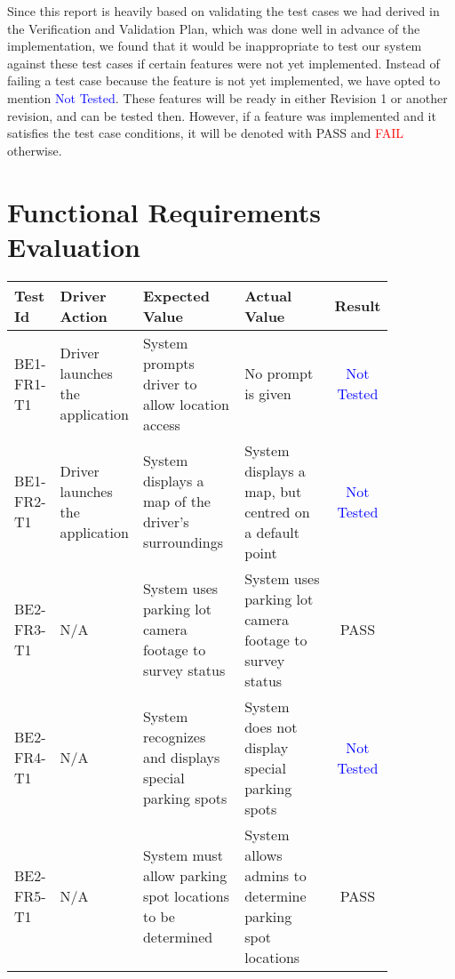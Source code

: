 \documentclass[12pt, titlepage]{article}
\begin{document}
\listoftables %

\listoffigures %

\newpage


Since this report is heavily based on validating the test cases we had derived
in the Verification and Validation Plan, which was done well in advance of the
implementation, we found that it would be inappropriate to test our system
against these test cases if certain features were not yet implemented. Instead
of failing a test case because the feature is not yet implemented, we have opted
to mention \textcolor{blue}{Not Tested}. These features will be ready in either
Revision 1 or another revision, and can be tested then. However, if a feature
was implemented and it satisfies the test case conditions, it will be denoted
with \textcolor{OliveGreen}{PASS} and \textcolor{Red}{FAIL} otherwise.

\newpage

\section{Functional Requirements Evaluation}

\begin{center}
\begin{tabular}{|p{0.10\linewidth}|p{0.15\linewidth}|p{0.30\linewidth}|p{0.30\linewidth}|c|} 
\hline
\textbf{Test Id} & \textbf{Driver Action} & \textbf{Expected Value} &
\textbf{Actual Value} & \textbf{Result} \\
\hline
BE1-FR1-T1 & Driver launches the application & System prompts driver to allow
location access & No prompt is given & \textcolor{blue}{Not Tested} \\
\hline
BE1-FR2-T1 & Driver launches the application & System displays a map of the
driver's surroundings & System displays a map, but centred on a default point &
\textcolor{blue}{Not Tested} \\ 
\hline
BE2-FR3-T1 & N/A & System uses parking lot camera footage to survey status &
System uses parking lot camera footage to survey status &
\textcolor{OliveGreen}{PASS} \\
\hline
BE2-FR4-T1 & N/A & System recognizes and displays special parking spots & System
does not display special parking spots & \textcolor{blue}{Not Tested} \\
\hline
BE2-FR5-T1 & N/A & System must allow parking spot locations to be determined &
System allows admins to determine parking spot locations &
\textcolor{OliveGreen}{PASS} \\
\hline
\end{tabular}
\end{center}
\end{document}
